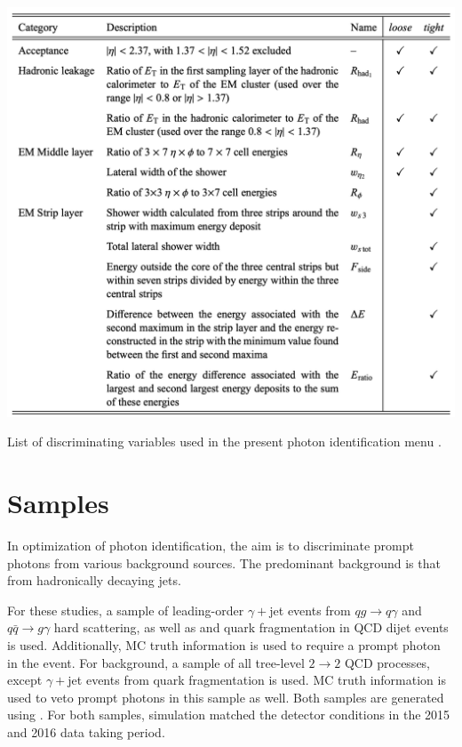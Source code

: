 \begin{table}[!thp]
    \centering
    \includegraphics[width=.90\textwidth]{chapters/chapter4_photonID/images/ss-table.png}
    \caption[List of discriminating variables used in the present photon identification menu.]
    {List of discriminating variables used in the present photon identification menu \cite{r1-photonID}.}
    \label{tab:ss-vars-table}
\end{table}

\section{Samples} \label{sec:photon-id-samples}

In optimization of photon identification, the aim is to discriminate prompt photons from various background sources. The predominant background is that from hadronically decaying jets. 

For these studies, a sample of leading-order $\gamma+$jet events from $qg \rightarrow q \gamma$ and $q\bar{q} \rightarrow g \gamma$ hard scattering, as well as and quark fragmentation in QCD dijet events is used. Additionally, \gls{MC} truth information is used to require a prompt photon in the event. For background, a sample of all tree-level $2\rightarrow2$ QCD processes, except $\gamma+$jet events from quark fragmentation is used. \gls{MC} truth information is used to veto prompt photons in this sample as well. Both samples are generated using \PYTHIA. For both samples, simulation matched the detector conditions in the 2015 and 2016 data taking period. 



